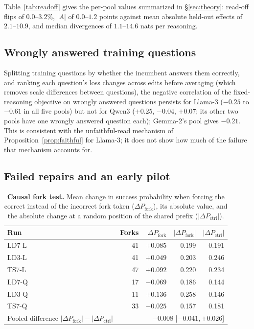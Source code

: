 Table~\ref{tab:readoff} gives the per-pool values summarized in \S\ref{sec:theory}: read-off flips
of $0.0$--$3.2\%$, $|A|$ of $0.0$--$1.2$ points against mean absolute held-out effects of
$2.1$--$10.9$, and
median divergences of $1.1$--$14.6$ nats per reasoning.

\subsection{Wrongly answered training questions}
\label{app:wrongrows}
Splitting training questions by whether the incumbent answers them correctly, and ranking each
question's loss changes across edits before averaging (which removes scale differences between
questions), the negative correlation of the fixed-reasoning objective on wrongly answered questions
persists for Llama-3 ($-0.25$ to $-0.61$ in all five pools) but not for Qwen3 ($+0.25$, $-0.04$,
$+0.07$; its other two pools have one wrongly answered question each); Gemma-2's pool gives
$-0.21$. This is consistent with the unfaithful-read mechanism of Proposition~\ref{prop:faithful}
for Llama-3; it does not show how much of the failure that mechanism accounts for.

\subsection{Failed repairs and an early pilot}

\begin{table}[h]
\centering
\caption{\textbf{Causal fork test.} Mean change in success probability when forcing the
correct instead of the incorrect fork token ($\Delta P_{\text{fork}}$), its absolute value,
and the absolute change at a random position of the shared prefix
($|\Delta P_{\text{ctrl}}|$).}
\label{tab:causal}
\small
\begin{tabular}{lrrrr}
\toprule
Run & Forks & $\Delta P_{\text{fork}}$ & $|\Delta P_{\text{fork}}|$ & $|\Delta P_{\text{ctrl}}|$ \\
\midrule
LD7-L & 41 & $+0.085$ & 0.199 & 0.191 \\
LD3-L & 41 & $+0.049$ & 0.203 & 0.246 \\
TS7-L & 47 & $+0.092$ & 0.220 & 0.234 \\
LD7-Q & 17 & $-0.069$ & 0.186 & 0.144 \\
LD3-Q & 11 & $+0.136$ & 0.258 & 0.146 \\
TS7-Q & 33 & $-0.025$ & 0.157 & 0.181 \\
\midrule
Pooled difference $|\Delta P_{\text{fork}}|-|\Delta P_{\text{ctrl}}|$ & \multicolumn{4}{r}{$-0.008$ [$-0.041,+0.026$]} \\
\bottomrule
\end{tabular}
\end{table}

